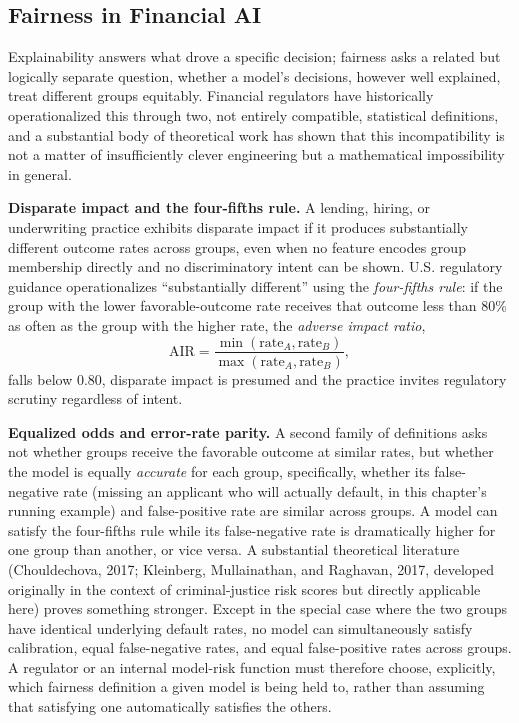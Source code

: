 \documentclass[../ai_in_finance]{subfiles}
\begin{document}
\subsection{Fairness in Financial AI}
\label{sec:fairness}

Explainability answers what drove a specific decision; fairness asks a related but logically separate question, whether a model's decisions, however well explained, treat different groups equitably. Financial regulators have historically operationalized this through two, not entirely compatible, statistical definitions, and a substantial body of theoretical work has shown that this incompatibility is not a matter of insufficiently clever engineering but a mathematical impossibility in general.

\textbf{Disparate impact and the four-fifths rule.} A lending, hiring, or underwriting practice exhibits disparate impact if it produces substantially different outcome rates across groups, even when no feature encodes group membership directly and no discriminatory intent can be shown. U.S. regulatory guidance operationalizes ``substantially different'' using the \emph{four-fifths rule}: if the group with the lower favorable-outcome rate receives that outcome less than 80\% as often as the group with the higher rate, the \emph{adverse impact ratio},
$$\text{AIR} = \frac{\min(\text{rate}_A, \text{rate}_B)}{\max(\text{rate}_A, \text{rate}_B)},$$
falls below 0.80, disparate impact is presumed and the practice invites regulatory scrutiny regardless of intent.

\textbf{Equalized odds and error-rate parity.} A second family of definitions asks not whether groups receive the favorable outcome at similar rates, but whether the model is equally \emph{accurate} for each group, specifically, whether its false-negative rate (missing an applicant who will actually default, in this chapter's running example) and false-positive rate are similar across groups. A model can satisfy the four-fifths rule while its false-negative rate is dramatically higher for one group than another, or vice versa. A substantial theoretical literature (Chouldechova, 2017; Kleinberg, Mullainathan, and Raghavan, 2017, developed originally in the context of criminal-justice risk scores but directly applicable here) proves something stronger. Except in the special case where the two groups have identical underlying default rates, no model can simultaneously satisfy calibration, equal false-negative rates, and equal false-positive rates across groups. A regulator or an internal model-risk function must therefore choose, explicitly, which fairness definition a given model is being held to, rather than assuming that satisfying one automatically satisfies the others.
\end{document}
